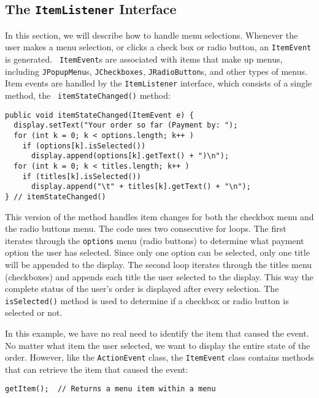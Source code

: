 \subsection{The {\tt ItemListener} Interface }
\noindent In this section, we will describe how to handle menu
selections.  Whenever the user makes a menu selection, or clicks a
check box or radio button, an {\tt ItemEvent} is generated.  {\tt
ItemEvent}s are associated with items that make up menus, including
{\tt JPop\-upMenu}s, {\tt JCheckboxes}, {\tt JRadioButton}s, and other
types of menus. Item events are handled by the {\tt ItemListener}
interface, which consists of a single method, the {\tt
itemStateChanged()} method:

\begin{jjjlisting}
\begin{lstlisting}
public void itemStateChanged(ItemEvent e) {
  display.setText("Your order so far (Payment by: ");
  for (int k = 0; k < options.length; k++ )
    if (options[k].isSelected())
      display.append(options[k].getText() + ")\n");
  for (int k = 0; k < titles.length; k++ )
    if (titles[k].isSelected())
      display.append("\t" + titles[k].getText() + "\n");
} // itemStateChanged()
\end{lstlisting}
\end{jjjlisting}

\noindent This version of the method handles item changes for both the
checkbox menu and the radio buttons menu.  The code uses two
consecutive for loops. The first iterates through the {\tt options}
menu (radio buttons) to determine what payment option the user has
selected. Since only one option can be selected, only one title will
be appended to the display. The second loop iterates through the
titles menu (checkboxes) and appends each title the user selected to
the display. This way the complete status of the user's order is
displayed after every selection. The {\tt isSelected()} method is used
to determine if a checkbox or radio button is selected or not.

In this example, we have no real need to identify the item that caused
the event. No matter what item the user selected, we want to display
the entire state of the order. However, like the \mbox{\tt ActionEvent}
class, the \mbox{\tt ItemEvent}  class contains methods that can 
retrieve the item that caused the event:

\begin{jjjlisting}
\begin{lstlisting}
getItem();  // Returns a menu item within a menu
\end{lstlisting}
\end{jjjlisting}

